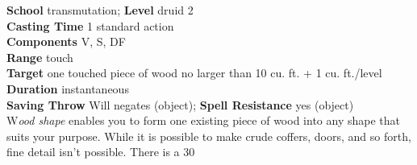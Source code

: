 \textbf{School} transmutation; \textbf{Level} druid 2\\
\textbf{Casting Time} 1 standard action\\
\textbf{Components} V, S, DF\\
\textbf{Range} touch\\
\textbf{Target} one touched piece of wood no larger than 10 cu. ft. + 1 cu. ft./level\\
\textbf{Duration} instantaneous\\
\textbf{Saving Throw }Will negates (object); \textbf{Spell Resistance} yes (object)\\
W\textit{ood shape }enables you to form one existing piece of wood into any shape that suits your purpose. While it is possible to make crude coffers, doors, and so forth, fine detail isn't possible. There is a 30%
